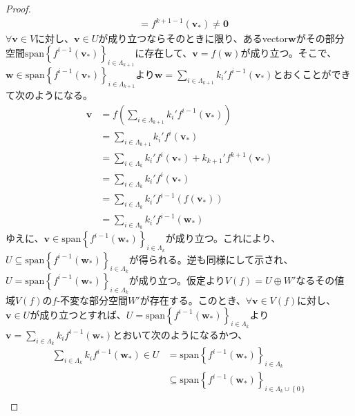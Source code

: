\documentclass[dvipdfmx]{jsarticle}
\begin{document}
\begin{proof}
\begin{align*}
&= f^{k + 1 - 1}\left( \mathbf{v}_{*} \right) \neq \mathbf{0}
\end{align*}
$\forall\mathbf{v} \in V$に対し、$\mathbf{v} \in U$が成り立つならそのときに限り、あるvector$\mathbf{w}$がその部分空間${\mathrm{span}}\left\{ f^{i - 1}\left( \mathbf{v}_{*} \right) \right\}_{i \in \varLambda_{k + 1}}$に存在して、$\mathbf{v} = f\left( \mathbf{w} \right)$が成り立つ。そこで、$\mathbf{w} \in {\mathrm{span}}\left\{ f^{i - 1}\left( \mathbf{v}_{*} \right) \right\}_{i \in \varLambda_{k + 1}}$より$\mathbf{w} = \sum_{i \in \varLambda_{k + 1}} {k_{i}'f^{i - 1}\left( \mathbf{v}_{*} \right)}$とおくことができて次のようになる。
\begin{align*}
\mathbf{v} &= f\left( \sum_{i \in \varLambda_{k + 1}} {k_{i}'f^{i - 1}\left( \mathbf{v}_{*} \right)} \right)\\
&= \sum_{i \in \varLambda_{k + 1}} {k_{i}'f^{i}\left( \mathbf{v}_{*} \right)}\\
&= \sum_{i \in \varLambda_{k}} {k_{i}'f^{i}\left( \mathbf{v}_{*} \right)} + k_{k + 1}'f^{k + 1}\left( \mathbf{v}_{*} \right)\\
&= \sum_{i \in \varLambda_{k}} {k_{i}'f^{i}\left( \mathbf{v}_{*} \right)}\\
&= \sum_{i \in \varLambda_{k}} {k_{i}'f^{i - 1}\left( f\left( \mathbf{v}_{*} \right) \right)}\\
&= \sum_{i \in \varLambda_{k}} {k_{i}'f^{i - 1}\left( \mathbf{w}_{*} \right)}
\end{align*}
ゆえに、$\mathbf{v} \in {\mathrm{span}}\left\{ f^{i - 1}\left( \mathbf{w}_{*} \right) \right\}_{i \in \varLambda_{k}}$が成り立つ。これにより、$U \subseteq {\mathrm{span}}\left\{ f^{i - 1}\left( \mathbf{w}_{*} \right) \right\}_{i \in \varLambda_{k}}$が得られる。逆も同様にして示され、$U = {\mathrm{span}}\left\{ f^{i - 1}\left( \mathbf{w}_{*} \right) \right\}_{i \in \varLambda_{k}}$が成り立つ。仮定より$V(f) = U \oplus W'$なるその値域$V(f)$の$f$-不変な部分空間$W'$が存在する。このとき、$\forall\mathbf{v} \in V(f)$に対し、$\mathbf{v} \in U$が成り立つとすれば、$U = {\mathrm{span}}\left\{ f^{i - 1}\left( \mathbf{w}_{*} \right) \right\}_{i \in \varLambda_{k}}$より$\mathbf{v} = \sum_{i \in \varLambda_{k}} {k_{i}f^{i - 1}\left( \mathbf{w}_{*} \right)}$とおいて次のようになるかつ、
\begin{align*}
\sum_{i \in \varLambda_{k}} {k_{i}f^{i - 1}\left( \mathbf{w}_{*} \right)} \in U &= {\mathrm{span}}\left\{ f^{i - 1}\left( \mathbf{w}_{*} \right) \right\}_{i \in \varLambda_{k}}\\
&\subseteq {\mathrm{span}}\left\{ f^{i - 1}\left( \mathbf{w}_{*} \right) \right\}_{i \in \varLambda_{k} \cup \left\{ 0 \right\}}\\

\end{align*}
\end{proof}
\end{document}
